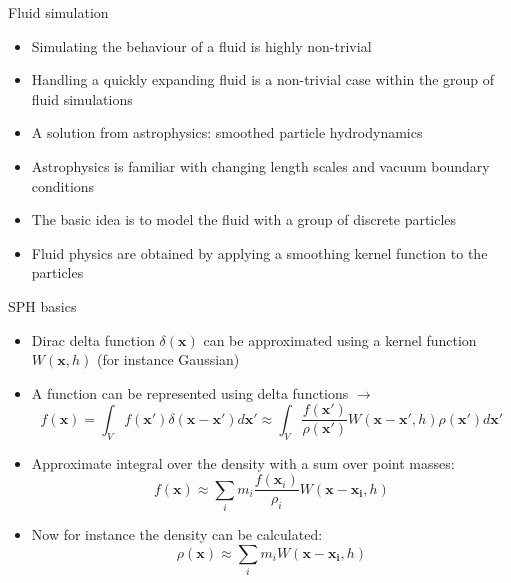 \documentclass{beamer}
\begin{document}
\begin{frame}{Fluid simulation}
\begin{itemize}

\item Simulating the behaviour of a fluid is highly non-trivial
\item Handling a quickly expanding fluid is a non-trivial case within the group of fluid simulations
\item A solution from astrophysics: smoothed particle hydrodynamics
\item Astrophysics is familiar with changing length scales and vacuum boundary conditions
\item The basic idea is to model the fluid with a group of discrete particles
\item Fluid physics are obtained by applying a smoothing kernel function to the particles

\end{itemize}
\end{frame}

\begin{frame}{SPH basics}
\begin{itemize}

\item Dirac delta function $\delta (\mathbf{x})$ can be approximated using  a kernel function $W(\mathbf{x},h)$ (for instance Gaussian)
\item A function can be represented using delta functions $\rightarrow$
\begin{equation}
 f(\mathbf{x}) = \int_V f(\mathbf{x}') \delta (\mathbf{x}-\mathbf{x}') d\mathbf{x}' \approx \int_V \frac{f(\mathbf{x}')}{\rho(\mathbf{x}')} W(\mathbf{x}-\mathbf{x}',h) \rho(\mathbf{x}') d\mathbf{x}' 
\end{equation}
\item Approximate integral over the density with a sum over point masses:
\begin{equation}
 f(\mathbf{x}) \approx \sum_i m_i \frac{f(\mathbf{x}_i)}{\rho_i} W( \mathbf{x} - \mathbf{x_i}, h )
\end{equation}
\item Now for instance the density can be calculated:
\begin{equation}
\rho(\mathbf{x}) \approx \sum_i m_i W( \mathbf{x} - \mathbf{x_i}, h )
\end{equation}

\end{itemize}
\end{frame}
\end{document}
